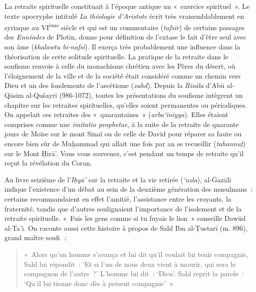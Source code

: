 La retraite spirituelle constituait à l'époque antique un «~exercice
spirituel~». Le texte apocryphe intitulé \emph{La théologie d'Aristote}
écrit très vraisemblablement en syriaque au VI\textsuperscript{ème}
siècle et qui est un commentaire (\emph{tafsīr}) de certains passages
des \emph{Ennéades} de Plotin, donne pour définition de l'extase le
fait d'être seul avec son âme (\emph{khalawtu bi-nafsi}). Il exerça très probablement une influence
dans la théorisation de cette solitude spirituelle. La pratique de la
retraite dans le soufisme renvoie à celle du monachisme chrétien avec
les Pères du désert, où l'éloignement de la ville et de la société était
considéré comme un chemin vers Dieu et un des fondements de l'ascétisme
(\emph{zuhd}). Depuis la \emph{Risāla} d'Abū al-Qāsim al-Qušayrī
(986-1072), toutes les présentations du soufisme intègrent un chapitre
sur les retraites spirituelles, qu'elles soient permanentes ou
périodiques. On appelait ces retraites des «~quarantaines~»
(\emph{arba`īniyya}). Elles étaient comprises comme une \emph{imitatio
prophetae}, à la suite de la retraite de quarante jours de Moïse sur le
mont Sinaï ou de celle de David pour réparer sa faute ou encore bien sûr
de Muḥammad qui allait une fois par an se recueillir (\emph{tahannuṯ})
sur le Mont Ḥirā'. Vous vous souvenez, c'est pendant un temps de retraite
qu'il reçut la révélation du Coran.

Au livre seizième de l'\emph{Iḥyā'} sur la retraite et la vie retirée
(\emph{`uzla}), al-Ġazālī \label{theol:AlGazali29} indique l'existence d'un débat au sein de la
deuxième génération des musulmans~: certains recommandaient en effet
l'amitié, l'assistance entre les croyants, la fraternité, tandis que
d'autres soulignaient l'importance de l'isolement et de la retraite
spirituelle. «~Fuis les gens comme si tu fuyais le lion~» conseille Dawūd al-Ta'i.
On raconte aussi cette histoire à propos de Sahl Ibn al-Ṭustarī (m.
896), grand maître soufi~.:
\begin{quote}
    
«~Alors qu'un homme s'avança et lui dit qu'il
voulait lui tenir compagnie, Sahl lui répondit~: `Et si l'un de nous
deux vient à mourir, qui sera le compagnon de l'autre~?' L'homme lui
dit~: `Dieu'. Sahl reprit la parole~: `Qu'il lui tienne donc dès à
présent compagnie'~»
\end{quote}


